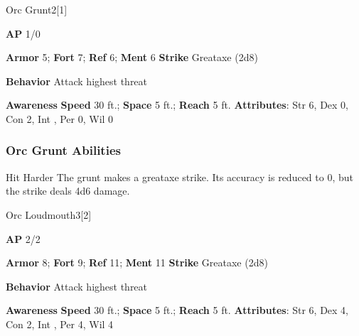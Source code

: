 \begin{monsection}{Orc Grunt}{2}[1]
\vspace{-1em}\vspace{-1em}
\begin{spellcontent}
\begin{spelltargetinginfo}
{\textbf{AP} 1/0}

\pari \textbf{Armor} 5;
\textbf{Fort} 7;
\textbf{Ref} 6;
\textbf{Ment} 6
\pari \textbf{Strike} Greataxe  (2d8)



\pari \textbf{Behavior} Attack highest threat
\end{spelltargetinginfo}
\end{spellcontent}

\begin{monsterfooter}
\pari \textbf{Awareness} 
\pari \textbf{Speed} 30 ft.;
\textbf{Space} 5 ft.;
\textbf{Reach} 5 ft.
\pari \textbf{Attributes}:
Str 6,
Dex 0,
Con 2,
Int ,
Per 0,
Wil 0
\end{monsterfooter}
\end{monsection}


\subsubsection{Orc Grunt Abilities}

\begin{freeability}{Hit Harder}
The grunt makes a greataxe strike.
Its accuracy is reduced to 0, but the strike deals 4d6 damage.
\end{freeability}

\begin{monsection}{Orc Loudmouth}{3}[2]
\vspace{-1em}\vspace{-1em}
\begin{spellcontent}
\begin{spelltargetinginfo}
{\textbf{AP} 2/2}

\pari \textbf{Armor} 8;
\textbf{Fort} 9;
\textbf{Ref} 11;
\textbf{Ment} 11
\pari \textbf{Strike} Greataxe  (2d8)



\pari \textbf{Behavior} Attack highest threat
\end{spelltargetinginfo}
\end{spellcontent}

\begin{monsterfooter}
\pari \textbf{Awareness} 
\pari \textbf{Speed} 30 ft.;
\textbf{Space} 5 ft.;
\textbf{Reach} 5 ft.
\pari \textbf{Attributes}:
Str 6,
Dex 4,
Con 2,
Int ,
Per 4,
Wil 4
\end{monsterfooter}
\end{monsection}


